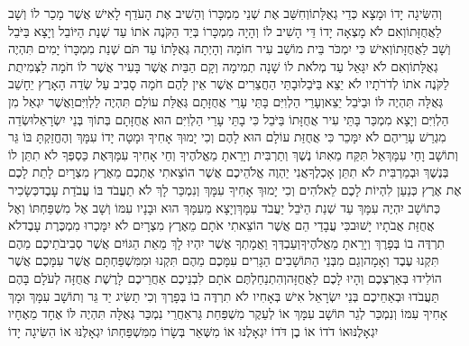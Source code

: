 \documentclass[../main/main.tex]{subfiles}
\begin{document}
\begin{multicols*}{\ncols}
וְהִשִּׂיגָה יָדוֹ וּמָצָא כְּדֵי גְאֻלָּתוֹ\PreVerseSpace{}וְחִשַּׁב אֶת שְׁנֵי מִמְכָּרוֹ וְהֵשִׁיב אֶת הָעֹדֵף לָאִישׁ אֲשֶׁר מָכַר לוֹ וְשָׁב לַאֲחֻזָּתוֹ\PreVerseSpace{}וְאִם לֹא מָצְאָה יָדוֹ דֵּי הָשִׁיב לוֹ וְהָיָה מִמְכָּרוֹ בְּיַד הַקֹּנֶה אֹתוֹ עַד שְׁנַת הַיּוֹבֵל וְיָצָא בַּיֹּבֵל וְשָׁב לַאֲחֻזָּתוֹ\PreVerseSpace{}וְאִישׁ כִּי יִמְכֹּר בֵּית מוֹשַׁב עִיר חוֹמָה וְהָיְתָה גְּאֻלָּתוֹ עַד תֹּם שְׁנַת מִמְכָּרוֹ יָמִים תִּהְיֶה גְאֻלָּתוֹ\PreVerseSpace{}וְאִם לֹא יִגָּאֵל עַד מְלֹאת לוֹ שָׁנָה תְמִימָה וְקָם הַבַּיִת אֲשֶׁר בָּעִיר אֲשֶׁר לוֹ\SubEnd{} חֹמָה לַצְּמִיתֻת לַקֹּנֶה אֹתוֹ לְדֹרֹתָיו לֹא יֵצֵא בַּיֹּבֵל\PreVerseSpace{}וּבָתֵּי הַחֲצֵרִים אֲשֶׁר אֵין לָהֶם חֹמָה סָבִיב עַל שְׂדֵה הָאָרֶץ יֵחָשֵׁב גְּאֻלָּה תִּהְיֶה לּוֹ וּבַיֹּבֵל יֵצֵא\PreVerseSpace{}וְעָרֵי הַלְוִיִּם בָּתֵּי עָרֵי אֲחֻזָּתָם גְּאֻלַּת עוֹלָם תִּהְיֶה לַלְוִיִּם\PreVerseSpace{}וַאֲשֶׁר יִגְאַל מִן הַלְוִיִּם וְיָצָא מִמְכַּר בָּתֵּי עִיר\SubEnd{} אֲחֻזָּתוֹ בַּיֹּבֵל כִּי בָתֵּי עָרֵי הַלְוִיִּם הוּא אֲחֻזָּתָם בְּתוֹךְ בְּנֵי יִשְׂרָאֵל\PreVerseSpace{}וּשְׂדֵה מִגְרַשׁ עָרֵיהֶם לֹא יִמָּכֵר כִּי אֲחֻזַּת עוֹלָם הוּא לָהֶם \ClosedSection{}וְכִי יָמוּךְ אָחִיךָ וּמָטָה יָדוֹ עִמָּךְ וְהֶחֱזַקְתָּ בּוֹ גֵּר וְתוֹשָׁב וָחַי עִמָּךְ\PreVerseSpace{}אַל תִּקַּח מֵאִתּוֹ נֶשֶׁךְ וְתַרְבִּית וְיָרֵאתָ מֵאֱלֹהֶיךָ וְחֵי אָחִיךָ עִמָּךְ\PreVerseSpace{}אֶת כַּסְפְּךָ לֹא תִתֵּן לוֹ בְּנֶשֶׁךְ וּבְמַרְבִּית לֹא תִתֵּן אָכְלֶךָ\PreVerseSpace{}אֲנִי יַהְוֶה אֱלֹהֵיכֶם אֲשֶׁר הוֹצֵאתִי אֶתְכֶם מֵאֶרֶץ מִצְרָיִם לָתֵת לָכֶם אֶת אֶרֶץ כְּנַעַן לִהְיוֹת לָכֶם לֵאלֹהִים \ClosedSection{}וְכִי יָמוּךְ אָחִיךָ עִמָּךְ וְנִמְכַּר לָךְ לֹא תַעֲבֹד בּוֹ עֲבֹדַת עָבֶד\PreVerseSpace{}כְּשָׂכִיר כְּתוֹשָׁב יִהְיֶה עִמָּךְ עַד שְׁנַת הַיֹּבֵל יַעֲבֹד עִמָּךְ\PreVerseSpace{}וְיָצָא מֵעִמָּךְ הוּא וּבָנָיו עִמּוֹ וְשָׁב אֶל מִשְׁפַּחְתּוֹ וְאֶל אֲחֻזַּת אֲבֹתָיו יָשׁוּב\PreVerseSpace{}כִּי עֲבָדַי הֵם אֲשֶׁר הוֹצֵאתִי אֹתָם מֵאֶרֶץ מִצְרָיִם לֹא יִמָּכְרוּ מִמְכֶּרֶת עָבֶד\PreVerseSpace{}לֹא תִרְדֶּה בוֹ בְּפָרֶךְ וְיָרֵאתָ מֵאֱלֹהֶיךָ\PreVerseSpace{}וְעַבְדְּךָ וַאֲמָתְךָ אֲשֶׁר יִהְיוּ לָךְ מֵאֵת הַגּוֹיִם אֲשֶׁר סְבִיבֹתֵיכֶם מֵהֶם תִּקְנוּ עֶבֶד וְאָמָה\PreVerseSpace{}וְגַם מִבְּנֵי הַתּוֹשָׁבִים הַגָּרִים עִמָּכֶם מֵהֶם תִּקְנוּ וּמִמִּשְׁפַּחְתָּם אֲשֶׁר עִמָּכֶם אֲשֶׁר הוֹלִידוּ בְּאַרְצְכֶם וְהָיוּ לָכֶם לַאֲחֻזָּה\PreVerseSpace{}וְהִתְנַחַלְתֶּם אֹתָם לִבְנֵיכֶם אַחֲרֵיכֶם לָרֶשֶׁת אֲחֻזָּה לְעֹלָם בָּהֶם תַּעֲבֹדוּ וּבְאַחֵיכֶם בְּנֵי יִשְׂרָאֵל אִישׁ בְּאָחִיו לֹא תִרְדֶּה בוֹ בְּפָרֶךְ \ClosedSection{}וְכִי תַשִּׂיג יַד גֵּר וְתוֹשָׁב עִמָּךְ וּמָךְ אָחִיךָ עִמּוֹ וְנִמְכַּר לְגֵר תּוֹשָׁב עִמָּךְ אוֹ לְעֵקֶר מִשְׁפַּחַת גֵּר\PreVerseSpace{}אַחֲרֵי נִמְכַּר גְּאֻלָּה תִּהְיֶה לּוֹ אֶחָד מֵאֶחָיו יִגְאָלֶנּוּ\PreVerseSpace{}אוֹ דֹדוֹ אוֹ בֶן דֹּדוֹ יִגְאָלֶנּוּ אוֹ מִשְּׁאֵר בְּשָׂרוֹ מִמִּשְׁפַּחְתּוֹ יִגְאָלֶנּוּ אוֹ הִשִּׂיגָה יָדוֹ 
\end{multicols*}
\end{document}
